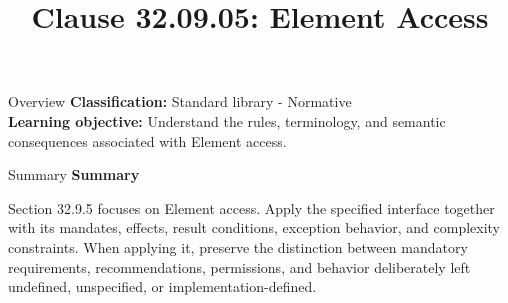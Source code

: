 \documentclass[10pt,letterpaper]{article}
\title{Clause 32.09.05: Element Access}
\author{}
\date{}
\begin{document}
\maketitle
\begin{CornellOverviewBox}{Overview}
\textbf{Classification:} Standard library - Normative\\[2pt]
\textbf{Learning objective:} Understand the rules, terminology, and semantic consequences associated with Element access.
\end{CornellOverviewBox}\begin{CornellSummaryBox}{Summary}
{\sffamily\bfseries\color{Accent} Summary}\par\vspace{3pt}Section 32.9.5 focuses on Element access. Apply the specified interface together with its mandates, effects, result conditions, exception behavior, and complexity constraints. When applying it, preserve the distinction between mandatory requirements, recommendations, permissions, and behavior deliberately left undefined, unspecified, or implementation-defined.
\end{CornellSummaryBox}
\end{document}
